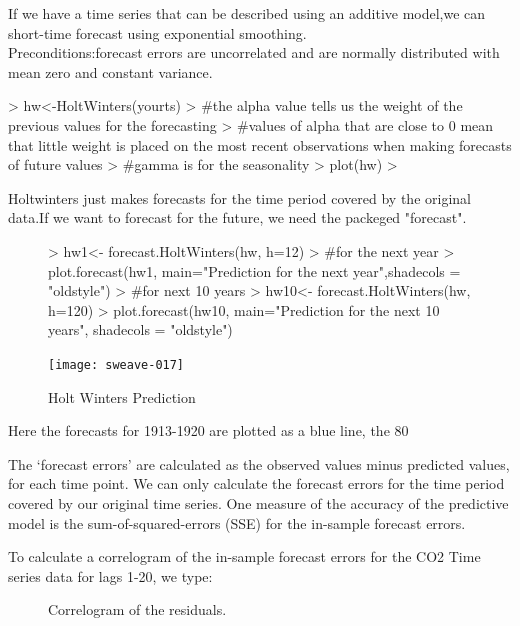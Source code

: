 \documentclass[11pt, a4paper]{article} %
\begin{document}
If we have a time series that can be described using an additive model,we can short-time forecast using exponential smoothing.\\
Preconditions:forecast errors are uncorrelated and are normally distributed with mean zero and constant variance.
\begin{Schunk}
\begin{Sinput}
> hw<-HoltWinters(yourts)
> #the alpha value tells us the weight of the previous values for the forecasting
> #values of alpha that are close to 0 mean that little weight is placed on the most recent observations when making forecasts of future values
> #gamma is for the seasonality
> plot(hw)
> 
\end{Sinput}
\end{Schunk}
Holtwinters just makes forecasts for the time period covered by the original data.If we want to forecast for the future, we need the packeged "forecast".

\begin{figure}
\centering
\begin{Schunk}
\begin{Sinput}
> hw1<- forecast.HoltWinters(hw, h=12)
> #for the next year  
> plot.forecast(hw1, main="Prediction for the next year",shadecols = "oldstyle")
> #for next 10 years
> hw10<- forecast.HoltWinters(hw, h=120)
> plot.forecast(hw10, main="Prediction for the next 10 years", shadecols = "oldstyle")
\end{Sinput}
\end{Schunk}
\texttt{[image: sweave-017]}
\caption{Holt Winters Prediction}
\end{figure}

Here the forecasts for 1913-1920 are plotted as a blue line, the 80%

The ‘forecast errors’ are calculated as the observed values minus predicted values, for each time point. We can only calculate the forecast errors for the time period covered by our original time series. One measure of the accuracy of the predictive model is the sum-of-squared-errors (SSE) for the in-sample forecast errors.

To calculate a correlogram of the in-sample forecast errors for the CO2 Time series data for lags 1-20, we type:

\begin{figure}
\centering
\begin{Schunk}
\end{Schunk}
\caption{Correlogram of the residuals.}
\end{figure}
\end{document}
